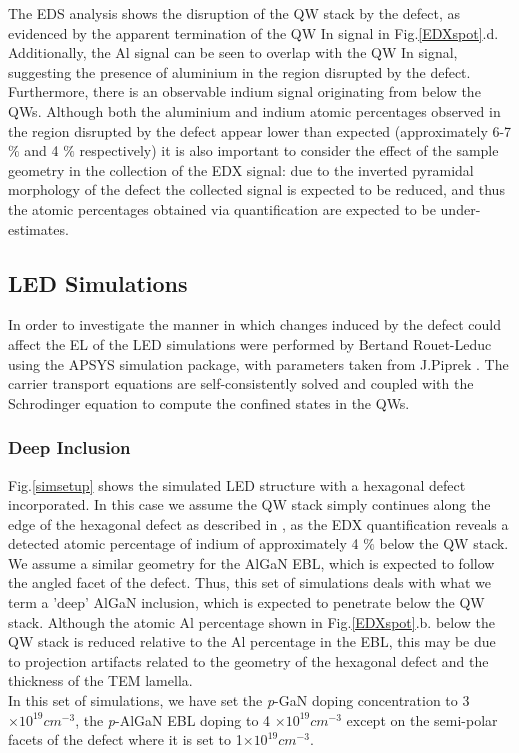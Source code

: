 \FloatBarrier 
The EDS analysis shows the disruption of the QW stack by the defect, as evidenced by the apparent termination of the QW In signal in Fig.\ref{EDXspot}.d. Additionally, the Al signal can be seen to overlap with the QW In signal, suggesting the presence of aluminium in the region disrupted by the defect. Furthermore, there is an observable indium signal originating from below the QWs. Although both the aluminium and indium atomic percentages observed in the region disrupted by the defect appear lower than expected (approximately 6-7 $\%$ and 4 $\%$ respectively) it is also important to consider the effect of the sample geometry in the collection of the EDX signal: due to the inverted pyramidal morphology of the defect the collected signal is expected to be reduced, and thus the atomic percentages obtained via quantification are expected to be under-estimates.

\subsection{LED Simulations}

In order to investigate the manner in which changes induced by the defect could affect the EL of the LED simulations were performed by Bertand Rouet-Leduc using the APSYS simulation package, with parameters taken from J.Piprek \cite{Piprek2007}. The carrier transport equations are self-consistently solved and coupled with the Schrodinger equation to compute the confined states in the QWs.\\

\subsubsection{Deep Inclusion}
Fig.\ref{simsetup} shows the simulated LED structure with a hexagonal defect incorporated. In this case we assume the QW stack simply continues along the edge of the hexagonal defect as described in \cite{Hangleiter2005}, as the EDX quantification reveals a detected atomic percentage of indium of approximately 4 $\%$ below the QW stack. We assume a similar geometry for the AlGaN EBL, which is expected to follow the angled facet of the defect. Thus, this set of simulations deals with what we term a 'deep' AlGaN inclusion, which is expected to penetrate below the QW stack. Although the atomic Al percentage shown in Fig.\ref{EDXspot}.b. below the QW stack is reduced relative to the Al percentage in the EBL, this may be due to projection artifacts related to the geometry of the hexagonal defect and the thickness of the TEM lamella.\\
In this set of simulations, we have set the {\it p}-GaN doping concentration to 3 $\times 10^{19} cm^{-3}$, the {\it p}-AlGaN EBL doping to 4 $\times 10^{19} cm^{-3}$ except on the semi-polar facets of the defect where it is set to 1$\times 10^{19} cm^{-3}$.


